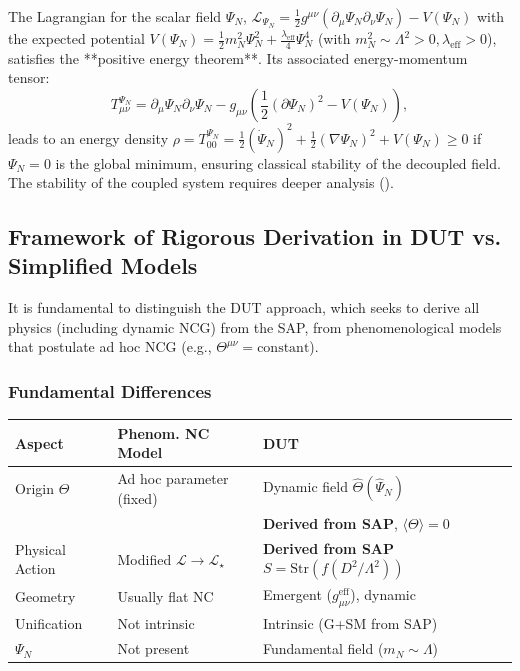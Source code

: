 \documentclass[11pt, a4paper]{article}
\theoremstyle{remark}
\newcommand{\Op}[1]{\hat{#1}}
\newcommand{\Str}{\mathrm{Str}}
\begin{document}
The Lagrangian for the scalar field \( \Psi_N \), \( \mathcal{L}_{\Psi_N} = \frac{1}{2} g^{\mu\nu} (\partial_\mu \Psi_N \partial_\nu \Psi_N) - V(\Psi_N) \) with the expected potential \( V(\Psi_N) = \frac{1}{2}m_N^2 \Psi_N^2 + \frac{\lambda_{\text{eff}}}{4}\Psi_N^4 \) (with \( m_N^2 \sim \Lambda^2 > 0, \lambda_{\text{eff}} > 0 \)), satisfies the **positive energy theorem**. Its associated energy-momentum tensor:
\[
T_{\mu\nu}^{\Psi_N} = \partial_\mu \Psi_N \partial_\nu \Psi_N - g_{\mu\nu} \left( \frac{1}{2}(\partial \Psi_N)^2 - V(\Psi_N) \right),
\]
leads to an energy density \( \rho = T_{00}^{\Psi_N} = \frac{1}{2}(\dot{\Psi}_N)^2 + \frac{1}{2}(\nabla \Psi_N)^2 + V(\Psi_N) \geq 0 \) if \( \Psi_N=0 \) is the global minimum, ensuring classical stability of the decoupled field. The stability of the coupled system requires deeper analysis ().


\subsection{Framework of Rigorous Derivation in DUT vs. Simplified Models}
\label{subsec:rigorous_derivation_framework}

It is fundamental to distinguish the DUT approach, which seeks to derive all physics (including dynamic NCG) from the SAP, from phenomenological models that postulate ad hoc NCG (e.g., \( \Theta^{\mu\nu} = \text{constant} \)).

\subsubsection{Fundamental Differences}
\begin{center}
\begin{tabularx}{\textwidth}{@{}lll@{}}
\toprule
\textbf{Aspect} & \textbf{Phenom. NC Model} & \textbf{DUT} \\
\midrule
Origin \( \Theta \) & Ad hoc parameter (fixed) & Dynamic field \( \Op{\Theta}(\Op{\Psi}_N) \) \\
& & \textbf{Derived from SAP}, \( \langle \Theta \rangle=0 \) \\
Physical Action & Modified \(\mathcal{L} \to \mathcal{L}_{\star}\) & \textbf{Derived from SAP} \(S = \Str(f(D^2/\Lambda^2))\) \\
Geometry & Usually flat NC & Emergent (\(g_{\mu\nu}^{\text{eff}}\)), dynamic \\
Unification & Not intrinsic & Intrinsic (G+SM from SAP) \\
\( \Psi_N \) & Not present & Fundamental field (\( m_N \sim \Lambda \)) \\
\bottomrule
\end{tabularx}
\end{center}
\end{document}
